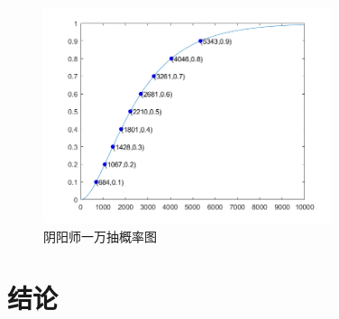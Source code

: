 \documentclass[10pt,journal,compsoc]{IEEEtran}
\begin{document}
\begin{figure}[H]
  \centering
  \includegraphics[width=20pc]{img/yys1w.png}
  \caption{阴阳师一万抽概率图}
  \label{fig:yys1w}
\end{figure}


\section{结论}





\end{document}
